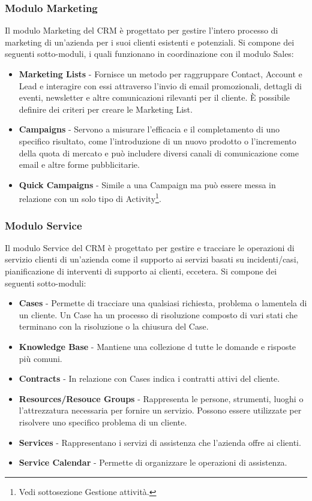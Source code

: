 \subsubsection{Modulo Marketing}
Il modulo Marketing del CRM è progettato per gestire l'intero processo di marketing di un'azienda per i suoi clienti esistenti e potenziali. Si compone dei seguenti sotto-moduli, i quali funzionano in coordinazione con il modulo Sales:
\begin{itemize}
  \item \textbf{Marketing Lists} - Fornisce un metodo per raggruppare Contact, Account e Lead e interagire con essi attraverso l'invio di email promozionali, dettagli di eventi, newsletter e altre comunicazioni rilevanti per il cliente. È possibile definire dei criteri per creare le Marketing List.
  \item \textbf{Campaigns} - Servono a misurare l'efficacia e il completamento di uno specifico risultato, come l'introduzione di un nuovo prodotto o l'incremento della quota di mercato e può includere diversi canali di comunicazione come email e altre forme pubblicitarie.
  \item \textbf{Quick Campaigns} - Simile a una Campaign ma può essere messa in relazione con un solo tipo di Activity\footnote{Vedi sottosezione Gestione attività.}.
\end{itemize}

\subsubsection{Modulo Service}
Il modulo Service del CRM è progettato per gestire e tracciare le operazioni di servizio clienti di un'azienda come il supporto ai servizi basati su incidenti/casi, pianificazione di interventi di supporto ai clienti, eccetera. Si compone dei seguenti sotto-moduli:
\begin{itemize}
  \item \textbf{Cases} - Permette di tracciare una qualsiasi richiesta, problema o lamentela di un cliente. Un Case ha un processo di risoluzione composto di vari stati che terminano con la risoluzione o la chiusura del Case.
  \item \textbf{Knowledge Base} - Mantiene una collezione d tutte le domande e risposte più comuni.
  \item \textbf{Contracts} - In relazione con Cases indica i contratti attivi del cliente.
  \item \textbf{Resources/Resouce Groups} - Rappresenta le persone, strumenti, luoghi o l'attrezzatura necessaria per fornire un servizio. Possono essere utilizzate per risolvere uno specifico problema di un cliente.
  \item \textbf{Services} - Rappresentano i servizi di assistenza che l'azienda offre ai clienti.
  \item \textbf{Service Calendar} - Permette di organizzare le operazioni di assistenza.
\end{itemize}

